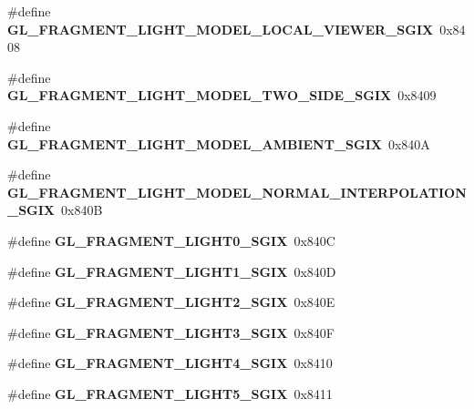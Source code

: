 \begin{DoxyCompactItemize}
\item 
\#define {\bfseries G\+L\+\_\+\+F\+R\+A\+G\+M\+E\+N\+T\+\_\+\+L\+I\+G\+H\+T\+\_\+\+M\+O\+D\+E\+L\+\_\+\+L\+O\+C\+A\+L\+\_\+\+V\+I\+E\+W\+E\+R\+\_\+\+S\+G\+I\+X}~0x8408\label{_s_d_l__opengl_8h_add9c3faacad3559696afef158935fe32}

\item 
\#define {\bfseries G\+L\+\_\+\+F\+R\+A\+G\+M\+E\+N\+T\+\_\+\+L\+I\+G\+H\+T\+\_\+\+M\+O\+D\+E\+L\+\_\+\+T\+W\+O\+\_\+\+S\+I\+D\+E\+\_\+\+S\+G\+I\+X}~0x8409\label{_s_d_l__opengl_8h_ae2981877c8b88da8514758bd269fd5f5}

\item 
\#define {\bfseries G\+L\+\_\+\+F\+R\+A\+G\+M\+E\+N\+T\+\_\+\+L\+I\+G\+H\+T\+\_\+\+M\+O\+D\+E\+L\+\_\+\+A\+M\+B\+I\+E\+N\+T\+\_\+\+S\+G\+I\+X}~0x840\+A\label{_s_d_l__opengl_8h_a11e892c73fb8de4205bcc219988e755a}

\item 
\#define {\bfseries G\+L\+\_\+\+F\+R\+A\+G\+M\+E\+N\+T\+\_\+\+L\+I\+G\+H\+T\+\_\+\+M\+O\+D\+E\+L\+\_\+\+N\+O\+R\+M\+A\+L\+\_\+\+I\+N\+T\+E\+R\+P\+O\+L\+A\+T\+I\+O\+N\+\_\+\+S\+G\+I\+X}~0x840\+B\label{_s_d_l__opengl_8h_ad0460ad4142bc7fc6e24f2f8afb5050b}

\item 
\#define {\bfseries G\+L\+\_\+\+F\+R\+A\+G\+M\+E\+N\+T\+\_\+\+L\+I\+G\+H\+T0\+\_\+\+S\+G\+I\+X}~0x840\+C\label{_s_d_l__opengl_8h_a72fba9bfca2086f02c1ba0fe31e66412}

\item 
\#define {\bfseries G\+L\+\_\+\+F\+R\+A\+G\+M\+E\+N\+T\+\_\+\+L\+I\+G\+H\+T1\+\_\+\+S\+G\+I\+X}~0x840\+D\label{_s_d_l__opengl_8h_a96839cc51c795f082f7c3cce831d04e0}

\item 
\#define {\bfseries G\+L\+\_\+\+F\+R\+A\+G\+M\+E\+N\+T\+\_\+\+L\+I\+G\+H\+T2\+\_\+\+S\+G\+I\+X}~0x840\+E\label{_s_d_l__opengl_8h_ac9c02b3aae25475714bdeada08940f01}

\item 
\#define {\bfseries G\+L\+\_\+\+F\+R\+A\+G\+M\+E\+N\+T\+\_\+\+L\+I\+G\+H\+T3\+\_\+\+S\+G\+I\+X}~0x840\+F\label{_s_d_l__opengl_8h_a044441810db876e0b75fa0135a05524a}

\item 
\#define {\bfseries G\+L\+\_\+\+F\+R\+A\+G\+M\+E\+N\+T\+\_\+\+L\+I\+G\+H\+T4\+\_\+\+S\+G\+I\+X}~0x8410\label{_s_d_l__opengl_8h_a14f57d914d74f0a2d79f7d463b089a73}

\item 
\#define {\bfseries G\+L\+\_\+\+F\+R\+A\+G\+M\+E\+N\+T\+\_\+\+L\+I\+G\+H\+T5\+\_\+\+S\+G\+I\+X}~0x8411\label{_s_d_l__opengl_8h_a873fb45cc7183265277a72c0e61c1c64}


\end{DoxyCompactItemize}
